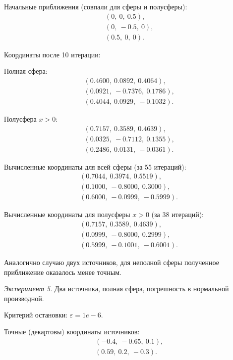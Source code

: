 Начальные приближения (совпали для сферы и полусферы):
\begin{align}
    (0,\ 0,\ 0.5) \text{,}\nonumber\\
    (0,\ -0.5,\ 0) \text{,}\nonumber\\
    (0.5,\ 0,\ 0) \text{.}\nonumber
\end{align}

Координаты после 10 итерации:

Полная сфера:
\begin{align}
    (0.4600,\ 0.0892,\ 0.4064) \text{,}\nonumber\\
    (0.0921,\ -0.7376,\ 0.1786) \text{,}\nonumber\\
    (0.4044,\ 0.0929,\ -0.1032) \text{.}\nonumber
\end{align}

Полусфера $x > 0$:
\begin{align}
    (0.7157,\ 0.3589,\ 0.4639) \text{,}\nonumber\\
    (0.0325,\ -0.7112,\ 0.1355) \text{,}\nonumber\\
    (0.2486,\ 0.0131,\ -0.0361) \text{.}\nonumber
\end{align}

Вычисленные координаты для всей сферы (за 55 итераций):
\begin{align}
    (0.7044,\ 0.3974,\ 0.5519) \text{,}\nonumber\\
    (0.1000,\ -0.8000,\ 0.3000) \text{,}\nonumber\\
    (0.6000,\ -0.0999,\ -0.5999) \text{.}\nonumber
\end{align}

Вычисленные координаты для полусферы $x > 0$ (за 38 итераций):
\begin{align}
    (0.7157,\ 0.3589,\ 0.4639) \text{,}\nonumber\\
    (0.0999,\ -0.8000,\ 0.2999) \text{,}\nonumber\\
    (0.5999,\ -0.1001,\ -0.6001) \text{.}\nonumber
\end{align}

Аналогично случаю двух источников, для неполной сферы полученное приближение оказалось менее точным.

\emph{Эксперимент 5.} Два источника, полная сфера, погрешность в нормальной производной.

Критерий остановки: $\varepsilon = 1e-6$.

Точные (декартовы) координаты источников:
\begin{align}
(-0.4,\ -0.65,\ 0.1) \text{,}\nonumber\\
(0.59,\ 0.2,\ -0.3) \text{.}\nonumber
\end{align}


